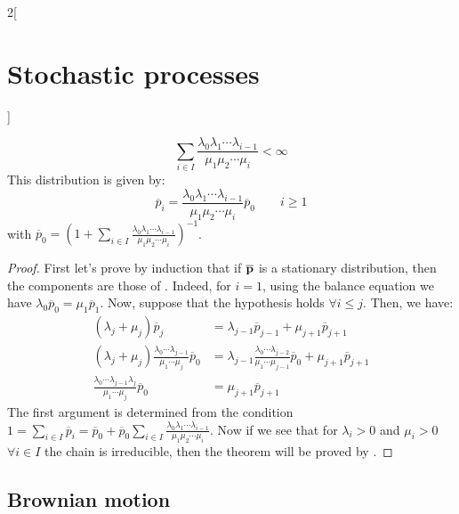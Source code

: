\documentclass[../../../main_math.tex]{subfiles}
\begin{document}
\begin{multicols}{2}[\section{Stochastic processes}]
\begin{theorem}
    $$
      \sum_{i\in I}\frac{\lambda_0\lambda_1\cdots\lambda_{i-1}}{\mu_1\mu_2\cdots\mu_i}<\infty
    $$
    This distribution is given by:
    \begin{equation}\label{SP:limit_distribution_birth_death}
      \overline{p}_i=\frac{\lambda_0\lambda_1\cdots\lambda_{i-1}}{\mu_1\mu_2\cdots\mu_i}\overline{p}_0 \qquad i\geq 1
    \end{equation}
    with $\overline{p}_0=\left(1+\sum_{i\in I}\frac{\lambda_0\lambda_1\cdots\lambda_{i-1}}{\mu_1\mu_2\cdots\mu_i}\right)^{-1}$.
  \end{theorem}
  \begin{proof}
    First let's prove by induction that if $\boldsymbol{\mathrm{\overline{p}}}$ is a stationary distribution, then the components are those of . Indeed, for $i=1$, using the balance equation we have $\lambda_0 \overline{p}_0=\mu_1\overline{p}_1$. Now, suppose that the hypothesis holds $\forall i\leq j$. Then, we have:
    \begin{align*}
      (\lambda_j+\mu_j) \overline{p}_j                                                      & = \lambda_{j-1}\overline{p}_{j-1}+\mu_{j+1}\overline{p}_{j+1}                                                      \\
      (\lambda_j+\mu_j) \frac{\lambda_0\cdots\lambda_{j-1}}{\mu_1\cdots\mu_j}\overline{p}_0 & = \lambda_{j-1}\frac{\lambda_0\cdots\lambda_{j-2}}{\mu_1\cdots\mu_{j-1}}\overline{p}_0+\mu_{j+1}\overline{p}_{j+1} \\
      \frac{\lambda_0\cdots\lambda_{j-1}\lambda_j}{\mu_1\cdots\mu_j}\overline{p}_0          & = \mu_{j+1}\overline{p}_{j+1}
    \end{align*}
    The first argument is determined from the condition $1=\sum_{i\in I} \overline{p}_i=\overline{p}_0+\overline{p}_0\sum_{i\in I}\frac{\lambda_0\lambda_1\cdots\lambda_{i-1}}{\mu_1\mu_2\cdots\mu_i}$. Now if we see that for $\lambda_i>0$ and $\mu_i>0$ $\forall i\in I$ the chain is irreducible, then the theorem will be proved by .
  \end{proof}
  \subsection{Brownian motion}

\end{multicols}
\end{document}
